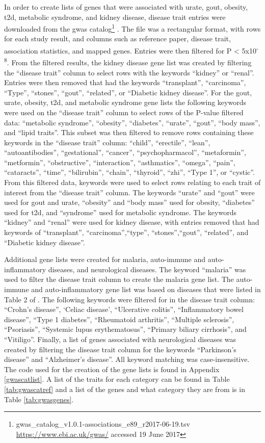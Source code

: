 \documentclass[]{report}
\begin{document}
In order to create lists of genes that were associated with urate, gout,
obesity, \gls{t2d}, metabolic syndrome, and kidney disease, disease
trait entries were downloaded from the \gls{gwas} catalog\footnote{gwas\_catalog\_v1.0.1-associations\_e89\_r2017-06-19.tsv
  \url{https://www.ebi.ac.uk/gwas/} accessed 19 June 2017}
\citep{MacArthur2017}. The file was a rectangular format, with rows for
each study result, and columns such as reference paper, disease trait,
association statistics, and mapped genes. Entries were then filtered for
P \textless{} 5x10\textsuperscript{-8}. From the filtered results, the
kidney disease gene list was created by filtering the ``disease trait''
column to select rows with the keywords ``kidney'' or ``renal''. Entries
were then removed that had the keywords ``transplant'', ``carcinoma'',
``Type'', ``stones'', ``gout'', ``related'', or ``Diabetic kidney
disease''. For the gout, urate, obesity, \gls{t2d}, and metabolic
syndrome gene lists the following keywords were used on the ``disease
trait'' column to select rows of the P-value filtered data: ``metabolic
syndrome'', ``obesity'', ``diabetes'', ``urate'', ``gout'', ``body
mass'', and ``lipid traits''. This subset was then filtered to remove
rows containing these keywords in the ``disease trait'' column:
``child'', ``erectile'', ``lean'', ``autoantibodies'', ``gestational'',
``cancer'', ``psychopharmacol'', ``metaformin'', ``metformin'',
``obstructive'', ``interaction'', ``asthmatics'', ``omega'', ``pain'',
``cataracts'', ``time'', ``bilirubin'', ``chain'', ``thyroid'', ``zhi'',
``Type 1'', or ``cystic''. From this filtered data, keywords were used
to select rows relating to each trait of interest from the ``disease
trait'' column. The keywords ``urate'' and ``gout'' were used for gout
and urate, ``obesity'' and ``body mass'' used for obesity, ``diabetes''
used for \gls{t2d}, and ``syndrome'' used for metabolic syndrome. The
keywords ``kidney'' and ``renal'' were used for kidney disease, with
entries removed that had keywords of ``transplant'',
``carcinoma'',``type'', ``stones'',``gout'', ``related'', and ``Diabetic
kidney disease''.

Additional gene lists were created for malaria, auto-immune and
auto-inflammatory diseases, and neurological diseases. The keyword
``malaria'' was used to filter the disease trait column to create the
malaria gene list. The auto-immune and auto-inflammatory gene list was
based on diseases that were listed in Table 2 of \citet{Zhang2013a}. The
following keywords were filtered for in the disease trait column:
``Crohn's disease'', `Celiac disease', ``Ulcerative colitis'',
``Inflammatory bowel disease'', ``Type 1 diabetes'', ``Rheumatoid
arthritis'', ``Multiple sclerosis'', ``Psoriasis'', ``Systemic lupus
erythematosus'', ``Primary biliary cirrhosis'', and ``Vitiligo''.
Finally, a list of genes associated with neurological diseases was
created by filtering the disease trait column for the keywords
``Parkinson's disease'' and ``Alzheimer's disease''. All keyword
matching was case-insensitive. The code used for the creation of the
gene lists is found in Appendix \ref{gwascatlist}. A list of the traits
for each category can be found in Table \ref{tab:gwascatref} and a list
of the genes and what category they are from is in Table
\ref{tab:gwasgenes}.
\end{document}
